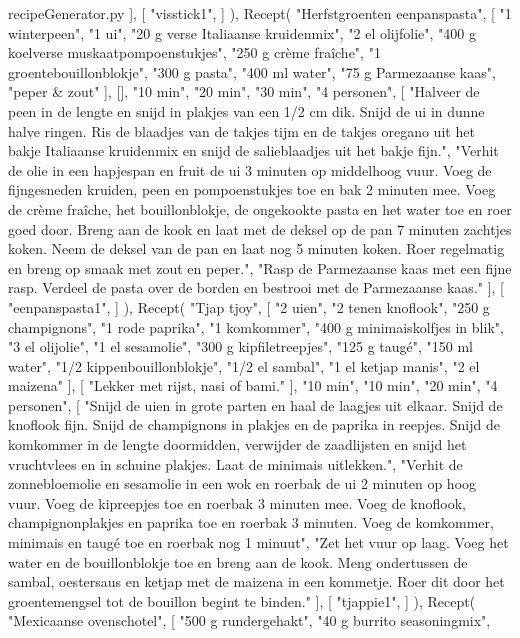\begin{filecontents*}{recipeGenerator.py}
	],
	[
	"visstick1",
	]
),
Recept(
	"Herfstgroenten eenpanspasta",
	[
		"1 winterpeen",
		"1 ui",
		"20 g verse Italiaanse kruidenmix",
		"2 el olijfolie",
		"400 g koelverse muskaatpompoenstukjes",
		"250 g crème fraîche",
		"1 groentebouillonblokje",
		"300 g pasta",
		"400 ml water",
		"75 g Parmezaanse kaas",
		"peper \& zout"
	],
	[],
	"10 min",
	"20 min",
	"30 min",
	"4 personen",
	[
		"Halveer de peen in de lengte en snijd in plakjes van een 1/2 cm dik. Snijd de ui in dunne halve ringen. Ris de blaadjes van de takjes tijm en de takjes oregano uit het bakje Italiaanse kruidenmix en snijd de salieblaadjes uit het bakje fijn.",
		"Verhit de olie in een hapjespan en fruit de ui 3 minuten op middelhoog vuur. Voeg de fijngesneden kruiden, peen en pompoenstukjes toe en bak 2 minuten mee. Voeg de crème fraîche, het bouillonblokje, de ongekookte pasta en het water toe en roer goed door. Breng aan de kook en laat met de deksel op de pan 7 minuten zachtjes koken. Neem de deksel van de pan en laat nog 5 minuten koken. Roer regelmatig en breng op smaak met zout en peper.",
		"Rasp de Parmezaanse kaas met een fijne rasp. Verdeel de pasta over de borden en bestrooi met de Parmezaanse kaas."
	],
	[
	"eenpanspasta1",
	]
),
Recept(
	"Tjap tjoy",
	[
		"2 uien",
		"2 tenen knoflook",
		"250 g champignons",
		"1 rode paprika",
		"1 komkommer",
		"400 g minimaiskolfjes in blik",
		"3 el olijolie",
		"1 el sesamolie",
		"300 g kipfiletreepjes",
		"125 g taugé",
		"150 ml water",
		"1/2 kippenbouillonblokje",
		"1/2 el sambal",
		"1 el ketjap manis",
		"2 el maizena"
	],
	[
		"Lekker met rijst, nasi of bami."
	],
	"10 min",
	"10 min",
	"20 min",
	"4 personen",
	[
		"Snijd de uien in grote parten en haal de laagjes uit elkaar. Snijd de knoflook fijn. Snijd de champignons in plakjes en de paprika in reepjes. Snijd de komkommer in de lengte doormidden, verwijder de zaadlijsten en snijd het vruchtvlees en in schuine plakjes. Laat de minimais uitlekken.",
		"Verhit de zonnebloemolie en sesamolie in een wok en roerbak de ui 2 minuten op hoog vuur. Voeg de kipreepjes toe en roerbak 3 minuten mee. Voeg de knoflook, champignonplakjes en paprika toe en roerbak 3 minuten. Voeg de komkommer, minimais en taugé toe en roerbak nog 1 minuut",
		"Zet het vuur op laag. Voeg het water en de bouillonblokje toe en breng aan de kook. Meng ondertussen de sambal, oestersaus en ketjap met de maizena in een kommetje. Roer dit door het groentemengsel tot de bouillon begint te binden."
	],
	[
	"tjappie1",
	]
),
Recept(
	"Mexicaanse ovenschotel",
	[
		"500 g rundergehakt",
		"40 g burrito seasoningmix",

\end{filecontents*}
